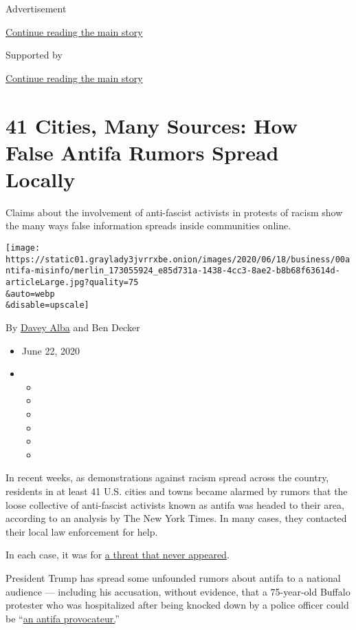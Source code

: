 Advertisement

\protect\hyperlink{after-top}{Continue reading the main story}

Supported by

\protect\hyperlink{after-sponsor}{Continue reading the main story}

\hypertarget{41-cities-many-sources-how-false-antifa-rumors-spread-locally}{%
\section{41 Cities, Many Sources: How False Antifa Rumors Spread
Locally}\label{41-cities-many-sources-how-false-antifa-rumors-spread-locally}}

Claims about the involvement of anti-fascist activists in protests of
racism show the many ways false information spreads inside communities
online.

\texttt{[image: https://static01.graylady3jvrrxbe.onion/images/2020/06/18/business/00antifa-misinfo/merlin\_173055924\_e85d731a-1438-4cc3-8ae2-b8b68f63614d-articleLarge.jpg?quality=75\\\&auto=webp\\\&disable=upscale]}

By \href{https://www.nytimes3xbfgragh.onion/by/davey-alba}{Davey Alba}
and Ben Decker

\begin{itemize}
\item
  June 22, 2020
\item
  \begin{itemize}
  \item
  \item
  \item
  \item
  \item
  \item
  \end{itemize}
\end{itemize}

In recent weeks, as demonstrations against racism spread across the
country, residents in at least 41 U.S. cities and towns became alarmed
by rumors that the loose collective of anti-fascist activists known as
antifa was headed to their area, according to an analysis by The New
York Times. In many cases, they contacted their local law enforcement
for help.

In each case, it was for
\href{https://www.nytimes3xbfgragh.onion/2020/06/11/us/antifa-protests-george-floyd.html}{a
threat that never appeared}.

President Trump has spread some unfounded rumors about antifa to a
national audience --- including his accusation, without evidence, that a
75-year-old Buffalo protester who was hospitalized after being knocked
down by a police officer could be
``\href{https://www.nytimes3xbfgragh.onion/2020/06/09/nyregion/who-is-martin-gugino-buffalo-police.html}{an
antifa provocateur.}''

